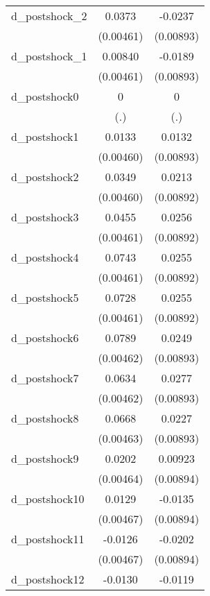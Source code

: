 {\begin{tabular}{l*{2}{c}}
d\_postshock\_2&   0.0373\sym{***}&  -0.0237\sym{**} \\
          &(0.00461)         &(0.00893)         \\
d\_postshock\_1&  0.00840         &  -0.0189\sym{*}  \\
          &(0.00461)         &(0.00893)         \\
d\_postshock0&        0         &        0         \\
          &      (.)         &      (.)         \\
d\_postshock1&   0.0133\sym{**} &   0.0132         \\
          &(0.00460)         &(0.00893)         \\
d\_postshock2&   0.0349\sym{***}&   0.0213\sym{*}  \\
          &(0.00460)         &(0.00892)         \\
d\_postshock3&   0.0455\sym{***}&   0.0256\sym{**} \\
          &(0.00461)         &(0.00892)         \\
d\_postshock4&   0.0743\sym{***}&   0.0255\sym{**} \\
          &(0.00461)         &(0.00892)         \\
d\_postshock5&   0.0728\sym{***}&   0.0255\sym{**} \\
          &(0.00461)         &(0.00892)         \\
d\_postshock6&   0.0789\sym{***}&   0.0249\sym{**} \\
          &(0.00462)         &(0.00893)         \\
d\_postshock7&   0.0634\sym{***}&   0.0277\sym{**} \\
          &(0.00462)         &(0.00893)         \\
d\_postshock8&   0.0668\sym{***}&   0.0227\sym{*}  \\
          &(0.00463)         &(0.00893)         \\
d\_postshock9&   0.0202\sym{***}&  0.00923         \\
          &(0.00464)         &(0.00894)         \\
d\_postshock10&   0.0129\sym{**} &  -0.0135         \\
          &(0.00467)         &(0.00894)         \\
d\_postshock11&  -0.0126\sym{**} &  -0.0202\sym{*}  \\
          &(0.00467)         &(0.00894)         \\
d\_postshock12&  -0.0130\sym{**} &  -0.0119         \\

\end{tabular}}
